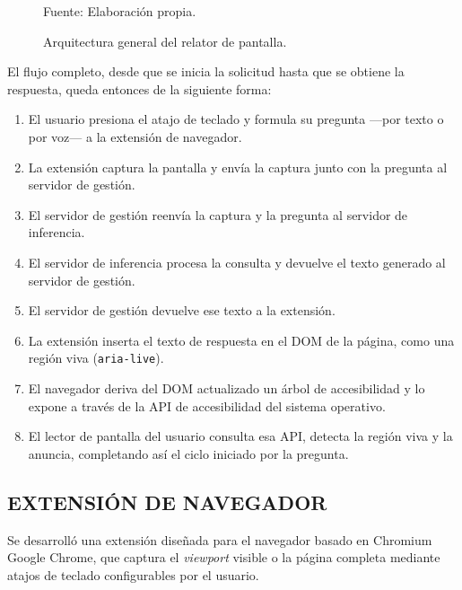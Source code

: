 \begin{figure}[h]
\caption{\label{fig:arquitectura} Arquitectura general del relator de pantalla.} Fuente: Elaboración propia.
\end{figure}

El flujo completo, desde que se inicia la solicitud hasta que se obtiene la respuesta, queda entonces de la siguiente forma:

\begin{enumerate}
    \item El usuario presiona el atajo de teclado y formula su pregunta —por texto o por voz— a la extensión de navegador.
    \item La extensión captura la pantalla y envía la captura junto con la pregunta al servidor de gestión.
    \item El servidor de gestión reenvía la captura y la pregunta al servidor de inferencia.
    \item El servidor de inferencia procesa la consulta y devuelve el texto generado al servidor de gestión.
    \item El servidor de gestión devuelve ese texto a la extensión.
    \item La extensión inserta el texto de respuesta en el DOM de la página, como una región viva (\texttt{aria-live}).
    \item El navegador deriva del DOM actualizado un árbol de accesibilidad y lo expone a través de la API de accesibilidad del sistema operativo.
    \item El lector de pantalla del usuario consulta esa API, detecta la región viva y la anuncia, completando así el ciclo iniciado por la pregunta.
\end{enumerate}

\subsection{EXTENSIÓN DE NAVEGADOR}

Se desarrolló una extensión diseñada para el navegador basado en Chromium Google Chrome, que captura el \textit{viewport} visible o la página completa mediante atajos de teclado configurables por el usuario.

